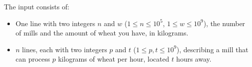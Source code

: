 
    The input consists of:
    \begin{itemize}
        \item One line with two integers $n$ and $w$ ($1\leq n\leq 10^5$, $1\leq w\leq 10^9$),
            the number of mills and the amount of wheat you have, in kilograms.
        \item $n$ lines, each with two integers $p$ and $t$ ($1\leq p, t\leq 10^9$),
            describing a mill that can process $p$ kilograms of wheat per hour, located $t$ hours away.
    \end{itemize}

